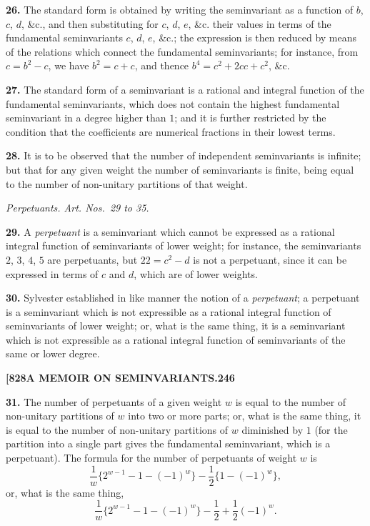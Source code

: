 \documentclass[11pt,a4paper]{book}
\begin{document}
\noindent\textbf{26.} The standard form is obtained by writing the seminvariant as a function of $b$, $c$, $d$, \&c., and then substituting for $c$, $d$, $e$, \&c. their values in terms of the fundamental seminvariants $c$, $d$, $e$, \&c.; the expression is then reduced by means of the relations which connect the fundamental seminvariants; for instance, from $c = b^2 - c$, we have $b^2 = c + c$, and thence $b^4 = c^2 + 2cc + c^2$, \&c.

\noindent\textbf{27.} The standard form of a seminvariant is a rational and integral function of the fundamental seminvariants, which does not contain the highest fundamental seminvariant in a degree higher than $1$; and it is further restricted by the condition that the coefficients are numerical fractions in their lowest terms.

\noindent\textbf{28.} It is to be observed that the number of independent seminvariants is infinite; but that for any given weight the number of seminvariants is finite, being equal to the number of non-unitary partitions of that weight.

\begin{center}
\textit{Perpetuants. Art. Nos.~29 to 35.}
\end{center}

\noindent\textbf{29.} A \textit{perpetuant} is a seminvariant which cannot be expressed as a rational integral function of seminvariants of lower weight; for instance, the seminvariants $2$, $3$, $4$, $5$ are perpetuants, but $22 = c^2 - d$ is not a perpetuant, since it can be expressed in terms of $c$ and $d$, which are of lower weights.

\noindent\textbf{30.} Sylvester established in like manner the notion of a \textit{perpetuant}; a perpetuant is a seminvariant which is not expressible as a rational integral function of seminvariants of lower weight; or, what is the same thing, it is a seminvariant which is not expressible as a rational integral function of seminvariants of the same or lower degree.

\newpage
\setcounter{page}{246}

\noindent\textbf{[828}\hfill\textbf{A MEMOIR ON SEMINVARIANTS.}\hfill\textbf{246}

\bigskip

\noindent\textbf{31.} The number of perpetuants of a given weight $w$ is equal to the number of non-unitary partitions of $w$ into two or more parts; or, what is the same thing, it is equal to the number of non-unitary partitions of $w$ diminished by $1$ (for the partition into a single part gives the fundamental seminvariant, which is a perpetuant). The formula for the number of perpetuants of weight $w$ is
\[
\frac{1}{w}\{2^{w-1} - 1 - (-1)^w\} - \frac{1}{2}\{1 - (-1)^w\},
\]
or, what is the same thing,
\[
\frac{1}{w}\{2^{w-1} - 1 - (-1)^w\} - \frac{1}{2} + \frac{1}{2}(-1)^w.
\]
\end{document}
